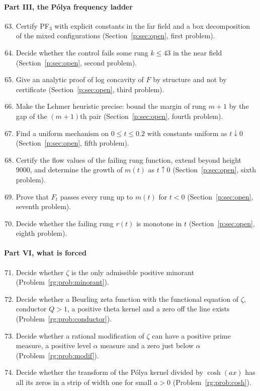 \paragraph{Part III, the P\'olya frequency ladder}
\begin{enumerate}
\setcounter{enumi}{62}
\item Certify PF$_3$ with explicit constants in the far field and a box decomposition of the mixed configurations (Section~\ref{p:sec:open}, first problem).
\item Decide whether the control fails some rung $k\le43$ in the near field (Section~\ref{p:sec:open}, second problem).
\item Give an analytic proof of log concavity of $F$ by structure and not by certificate (Section~\ref{p:sec:open}, third problem).
\item Make the Lehmer heuristic precise: bound the margin of rung $m+1$ by the gap of the $(m+1)$th pair (Section~\ref{p:sec:open}, fourth problem).
\item Find a uniform mechanism on $0\le t\le0.2$ with constants uniform as $t\downarrow0$ (Section~\ref{p:sec:open}, fifth problem).
\item Certify the flow values of the failing rung function, extend beyond height $9000$, and determine the growth of $m(t)$ as $t\uparrow0$ (Section~\ref{p:sec:open}, sixth problem).
\item Prove that $F_t$ passes every rung up to $m(t)$ for $t<0$ (Section~\ref{p:sec:open}, seventh problem).
\item Decide whether the failing rung $r(t)$ is monotone in $t$ (Section~\ref{p:sec:open}, eighth problem).
\end{enumerate}

\paragraph{Part VI, what is forced}
\begin{enumerate}
\setcounter{enumi}{70}
\item Decide whether $\zeta$ is the only admissible positive minorant (Problem~\ref{rg:prob:minorant}).
\item Decide whether a Beurling zeta function with the functional equation of $\zeta$, conductor $Q>1$, a positive theta kernel and a zero off the line exists (Problem~\ref{rg:prob:conductor}).
\item Decide whether a rational modification of $\zeta$ can have a positive prime measure, a positive level $\alpha$ measure and a zero just below $\alpha$ (Problem~\ref{rg:prob:modif}).
\item Decide whether the transform of the P\'olya kernel divided by $\cosh(ax)$ has all its zeros in a strip of width one for small $a>0$ (Problem~\ref{rg:prob:cosh}).
\end{enumerate}


